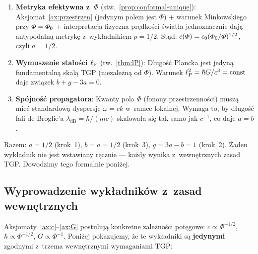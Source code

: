 \begin{remark}[Trzy kroki do $(a,b,g) = (1/2, 1/2, 1)$]\label{rem:hierarchia-skalowania}
\begin{enumerate}
  \item \textbf{Metryka efektywna z~$\Phi$}
    (stw.~\ref{prop:conformal-unique}):
    Aksjomat~\ref{ax:przestrzen} (jedynym polem jest $\Phi$)
    + warunek Minkowskiego przy $\varPhi = \varPhi_0$
    + interpretacja fizyczna pr\k{e}dko\'sci \'swiat\l{}a
    jednoznacznie daj\k{a} antypodaln\k{a} metryk\k{e}
    z~wyk\l{}adnikiem $p = 1/2$. St\k{a}d:
    $c(\varPhi) = c_0(\varPhi_0/\varPhi)^{1/2}$, czyli $a = 1/2$.

  \item \textbf{Wymuszenie sta\l{}o\'sci $\ell_{\mathrm{P}}$}
    (tw.~\ref{thm:lP}):
    D\l{}ugo\'s\'c Plancka jest jedyn\k{a} fundamentaln\k{a}
    skal\k{a} TGP (niezale\.zn\k{a} od $\Phi$).
    Warunek $\ell_{\mathrm{P}}^2 = \hbar G / c^3 = \mathrm{const}$
    daje zwi\k{a}zek $b + g - 3a = 0$.

  \item \textbf{Sp\'ojno\'s\'c propagatora}:
    Kwanty pola $\Phi$ (fonony przestrzenno\'sci) musz\k{a}
    mie\'c standardow\k{a} dyspersj\k{e} $\omega = ck$
    w~ramce lokalnej. Wymaga to, by d\l{}ugo\'s\'c fali
    de Broglie'a $\lambda_{\mathrm{dB}} = \hbar/(mc)$
    skalowa\l{}a si\k{e} tak samo jak $c^{-1}$, co daje $a = b$.
\end{enumerate}

Razem: $a = 1/2$ (krok~1), $b = a = 1/2$ (krok~3),
$g = 3a - b = 1$ (krok~2). \.Zaden wyk\l{}adnik nie jest
wstawiany r\k{e}cznie --- ka\.zdy wynika z~wewn\k{e}trznych
zasad TGP. Dowodzimy tego formalnie poni\.zej.
\end{remark}

\subsection{Wyprowadzenie wyk\l{}adnik\'ow z~zasad
  wewn\k{e}trznych}\label{ssec:wykladniki}

Aksjomaty~\ref{ax:c}--\ref{ax:G} postuluj\k{a} konkretne
zale\.zno\'sci pot\k{e}gowe: $c \propto \Phi^{-1/2}$,
$\hbar \propto \Phi^{-1/2}$, $G \propto \Phi^{-1}$.
Poni\.zej pokazujemy, \.ze te wyk\l{}adniki s\k{a}
\textbf{jedynymi} zgodnymi z~trzema wewn\k{e}trznymi
wymaganiami TGP:

